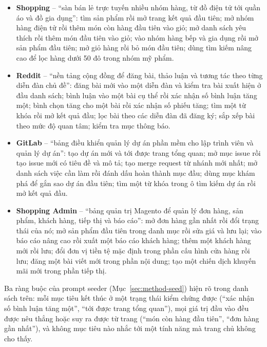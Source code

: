 \begin{itemize}
  \item \textbf{Shopping} -- ``sàn bán lẻ trực tuyến nhiều nhóm hàng, từ đồ
  điện tử tới quần áo và đồ gia dụng'': tìm sản phẩm rồi mở trang kết quả đầu
  tiên; mở nhóm hàng điện tử rồi thêm món còn hàng đầu tiên vào giỏ; mở danh
  sách yêu thích rồi thêm món đầu tiên vào giỏ; vào nhóm hàng bếp và gia dụng
  rồi mở sản phẩm đầu tiên; mở giỏ hàng rồi bỏ món đầu tiên; dùng tìm kiếm
  nâng cao để lọc hàng dưới 50 đô trong nhóm mỹ phẩm.

  \item \textbf{Reddit} -- ``nền tảng cộng đồng để đăng bài, thảo luận và
  tương tác theo từng diễn đàn chủ đề'': đăng bài mới vào một diễn đàn và
  kiểm tra bài xuất hiện ở đầu danh sách; bình luận vào một bài cụ thể rồi
  xác nhận số bình luận tăng một; bình chọn tăng cho một bài rồi xác nhận số
  phiếu tăng; tìm một từ khóa rồi mở kết quả đầu; lọc bài theo các diễn đàn đã
  đăng ký; sắp xếp bài theo mức độ quan tâm; kiểm tra mục thông báo.

  \item \textbf{GitLab} -- ``bảng điều khiển quản lý dự án phần mềm cho lập
  trình viên và quản lý dự án'': tạo dự án mới và tới được trang tổng quan;
  mở mục issue rồi tạo issue mới có tiêu đề và mô tả; tạo merge request từ
  nhánh mới nhất; mở danh sách việc cần làm rồi đánh dấu hoàn thành mục đầu;
  dùng mục khám phá để gắn sao dự án đầu tiên; tìm một từ khóa trong ô tìm
  kiếm dự án rồi mở kết quả đầu.

  \item \textbf{Shopping Admin} -- ``bảng quản trị Magento để quản lý đơn
  hàng, sản phẩm, khách hàng, tiếp thị và báo cáo'': mở đơn hàng gần nhất rồi
  đổi trạng thái của nó; mở sản phẩm đầu tiên trong danh mục rồi sửa giá và
  lưu lại; vào báo cáo nâng cao rồi xuất một báo cáo khách hàng; thêm một
  khách hàng mới rồi lưu; đổi đơn vị tiền tệ mặc định trong phần cấu hình cửa
  hàng rồi lưu; đăng một bài viết mới trong phần nội dung; tạo một chiến dịch
  khuyến mãi mới trong phần tiếp thị.
\end{itemize}

\noindent
Ba ràng buộc của prompt seeder (Mục~\ref{sec:method-seed}) hiện rõ trong danh
sách trên: mỗi mục tiêu kết thúc ở một trạng thái kiểm chứng được (``xác nhận
số bình luận tăng một'', ``tới được trang tổng quan''), mọi giá trị đầu vào
đều được nêu thẳng hoặc suy ra được từ trang (``món còn hàng đầu tiên'', ``đơn
hàng gần nhất''), và không mục tiêu nào nhắc tới một tính năng mà trang chủ
không cho thấy.

